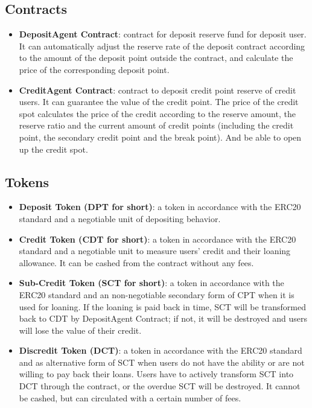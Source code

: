 \documentclass[a4paper, 10pt, conference]{ieeeconf} %
\begin{document}
\subsection{Contracts}

\begin{itemize} 
   \item \textbf{DepositAgent Contract}: contract for deposit reserve fund for deposit user. It can automatically adjust the reserve rate of the deposit contract according to the amount of the deposit point outside the contract, and calculate the price of the corresponding deposit point.
   \item \textbf{CreditAgent Contract}: contract to deposit credit point reserve of credit users. It can guarantee the value of the credit point. The price of the credit spot calculates the price of the credit according to the reserve amount, the reserve ratio and the current amount of credit points (including the credit point, the secondary credit point and the break point). And be able to open up the credit spot.
\end{itemize}

\subsection{Tokens}

\begin{itemize} 
   \item \textbf{Deposit Token (DPT for short)}: a token in accordance with the ERC20 standard and a negotiable unit of depositing behavior.
   \item  \textbf{Credit Token (CDT for short)}: a token in accordance with the ERC20 standard and a negotiable unit to measure users' credit and their loaning allowance. It can be cashed from the contract without any fees.
   \item  \textbf{Sub-Credit Token (SCT for short)}: a token in accordance with the ERC20 standard and an non-negotiable secondary form of CPT when it is used for loaning. If the loaning is paid back in time, SCT will be transformed back to CDT by DepositAgent Contract; if not, it will be destroyed and users will lose the value of their credit.
   \item \textbf{Discredit Token (DCT)}: a token in accordance with the ERC20 standard and as alternative form of SCT when users do not have the ability or are not willing to pay back their loans. Users have to actively transform SCT into DCT through the contract, or the overdue SCT will be destroyed. It cannot be cashed, but can circulated with a certain number of fees.
\end{itemize}
\end{document}
